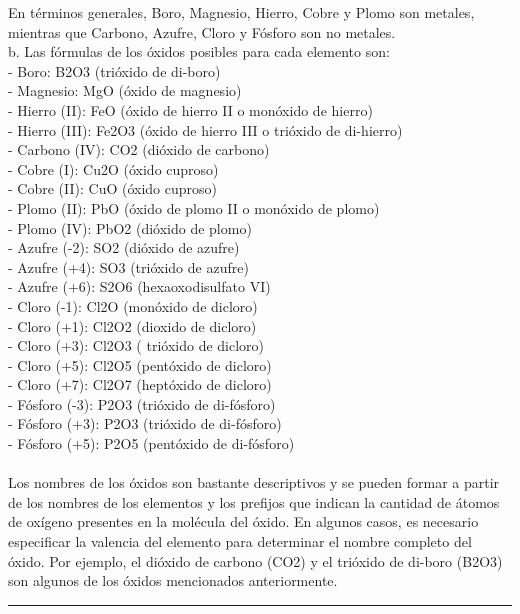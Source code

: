 \documentclass{article}
\begin{document}
En términos generales, Boro, Magnesio, Hierro, Cobre y Plomo son metales, mientras que Carbono, Azufre, Cloro y Fósforo son no metales.\\
b. Las fórmulas de los óxidos posibles para cada elemento son:\\
- Boro: B2O3 (trióxido de di-boro)\\
- Magnesio: MgO (óxido de magnesio)\\
- Hierro (II): FeO (óxido de hierro II o monóxido de hierro)\\
- Hierro (III): Fe2O3 (óxido de hierro III o trióxido de di-hierro)\\
- Carbono (IV): CO2 (dióxido de carbono)\\
- Cobre (I): Cu2O (óxido cuproso)\\
- Cobre (II): CuO (óxido cuproso)\\
- Plomo (II): PbO (óxido de plomo II o monóxido de plomo)\\
- Plomo (IV): PbO2 (dióxido de plomo)\\
- Azufre (-2): SO2 (dióxido de azufre)\\
- Azufre (+4): SO3 (trióxido de azufre)\\
- Azufre (+6): S2O6 (hexaoxodisulfato VI)\\
- Cloro (-1): Cl2O (monóxido de dicloro)\\
- Cloro (+1): Cl2O2 (dioxido de dicloro)\\
- Cloro (+3): Cl2O3 ( trióxido de dicloro)\\
- Cloro (+5): Cl2O5 (pentóxido de dicloro)\\
- Cloro (+7): Cl2O7 (heptóxido de dicloro)\\
- Fósforo (-3): P2O3 (trióxido de di-fósforo)\\
- Fósforo (+3): P2O3 (trióxido de di-fósforo)\\
- Fósforo (+5): P2O5 (pentóxido de di-fósforo)\\
\\
Los nombres de los óxidos son bastante descriptivos y se pueden formar a partir de los nombres de los elementos y los prefijos que indican la cantidad de átomos de oxígeno presentes en la molécula del óxido. En algunos casos, es necesario especificar la valencia del elemento para determinar el nombre completo del óxido. Por ejemplo, el dióxido de carbono (CO2) y el trióxido de di-boro (B2O3) son algunos de los óxidos mencionados anteriormente.\\
\noindent\rule{\textwidth}{1pt} \\
\end{document}
